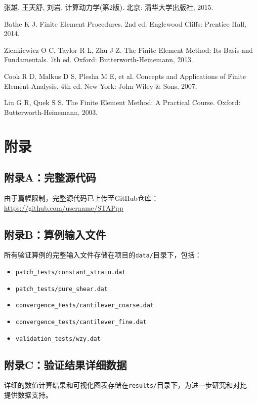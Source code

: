 \documentclass[12pt,a4paper]{article}
\begin{document}
\begin{thebibliography}{99}
 张雄, 王天舒, 刘岩. 计算动力学(第2版). 北京: 清华大学出版社, 2015.

 Bathe K J. Finite Element Procedures. 2nd ed. Englewood Cliffs: Prentice Hall, 2014.

 Zienkiewicz O C, Taylor R L, Zhu J Z. The Finite Element Method: Its Basis and Fundamentals. 7th ed. Oxford: Butterworth-Heinemann, 2013.

 Cook R D, Malkus D S, Plesha M E, et al. Concepts and Applications of Finite Element Analysis. 4th ed. New York: John Wiley \& Sons, 2007.

 Liu G R, Quek S S. The Finite Element Method: A Practical Course. Oxford: Butterworth-Heinemann, 2003.
\end{thebibliography}

\section{附录}

\subsection{附录A：完整源代码}

由于篇幅限制，完整源代码已上传至GitHub仓库：\\
\url{https://github.com/username/STAPpp}

\subsection{附录B：算例输入文件}

所有验证算例的完整输入文件存储在项目的\texttt{data/}目录下，包括：
\begin{itemize}
    \item \texttt{patch\_tests/constant\_strain.dat}
    \item \texttt{patch\_tests/pure\_shear.dat}
    \item \texttt{convergence\_tests/cantilever\_coarse.dat}
    \item \texttt{convergence\_tests/cantilever\_fine.dat}
    \item \texttt{validation\_tests/wzy.dat}
\end{itemize}

\subsection{附录C：验证结果详细数据}

详细的数值计算结果和可视化图表存储在\texttt{results/}目录下，为进一步研究和对比提供数据支持。
\end{document}
